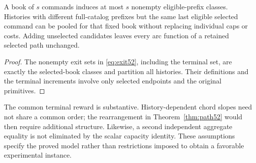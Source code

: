 \begin{corollary}\label{cor:endogenous52}
A book of $s$ commands induces at most $s$ nonempty eligible-prefix classes. Histories with different full-catalog prefixes but the same last eligible selected command can be pooled for that fixed book without replacing individual caps or costs. Adding unselected candidates leaves every arc function of a retained selected path unchanged.
\end{corollary}
\begin{proof}
The nonempty exit sets in \eqref{eq:exit52}, including the terminal set, are exactly the selected-book classes and partition all histories. Their definitions and the terminal increments involve only selected endpoints and the original primitives.
\end{proof}

The common terminal reward is substantive. History-dependent chord slopes need not share a common order; the rearrangement in Theorem~\ref{thm:path52} would then require additional structure. Likewise, a second independent aggregate equality is not eliminated by the scalar capacity identity. These assumptions specify the proved model rather than restrictions imposed to obtain a favorable experimental instance.
